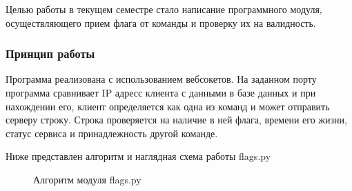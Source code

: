Целью работы в текущем семестре стало написание программного модуля, осуществляющего прием флага от команды и проверку их на валидность.

\subsubsection{Принцип работы}

Программа реализована с использованием вебсокетов. На заданном порту программа сравнивает IP адресс клиента с данными в базе данных и при нахождении его, клиент определяется как одна из команд и может отправить серверу строку. Строка проверяется на наличие в ней флага, времени его жизни, статус сервиса и принадлежность другой команде.

Ниже представлен алгоритм и наглядная схема работы flags.py

\begin{figure}[h!]
\caption{Алгоритм модуля flags.py}
\end{figure} 

